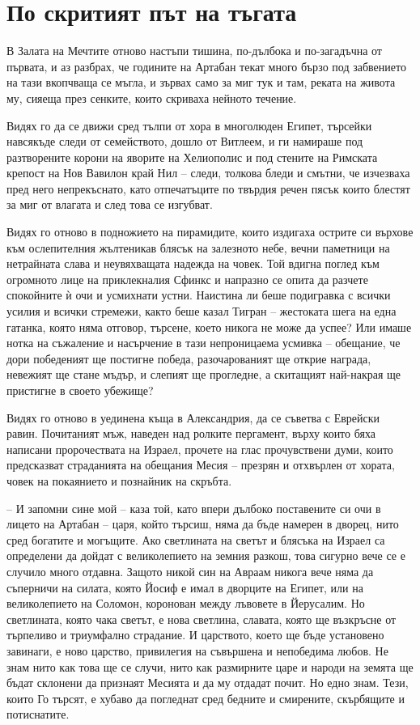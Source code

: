 \part{По скритият път на тъгата}

В Залата на Мечтите отново настъпи тишина, по-дълбока и по-загадъчна от първата,
и аз разбрах, че годините на Артабан текат много бързо под забвението на тази
вкопчваща се мъгла, и зървах само за миг тук и там, реката на живота му, сияеща
през сенките, които скриваха нейното течение.

Видях го да се движи сред тълпи от хора в многолюден Египет, търсейки навсякъде
следи от семейството, дошло от Витлеем, и ги намираше под разтворените корони на
яворите на Хелиополис и под стените на Римската крепост на Нов Вавилон край Нил
-- следи, толкова бледи и смътни, че изчезваха пред него непрекъснато, като
отпечатъците по твърдия речен пясък които блестят за миг от влагата и след това
се изгубват.

Видях го отново в подножието на пирамидите, които издигаха острите си върхове
към ослепителния жълтеникав блясък на залезното небе, вечни паметници на
нетрайната слава и неувяхващата надежда на човек. Той вдигна поглед към
огромното лице на приклекналия Сфинкс и напразно се опита да разчете спокойните
ѝ очи и усмихнати устни. Наистина ли беше подигравка с всички усилия и всички
стремежи, както беше казал Тигран -- жестоката шега на една гатанка, която няма
отговор, търсене, което никога не може да успее? Или имаше нотка на съжаление и
насърчение в тази непроницаема усмивка -- обещание, че дори победеният ще
постигне победа, разочарованият ще открие награда, невежият ще стане мъдър, и
слепият ще прогледне, а скитащият най-накрая ще пристигне в своето убежище?

Видях го отново в уединена къща в Александрия, да се съветва с Еврейски равин.
Почитаният мъж, наведен над ролките пергамент, върху които бяха написани
пророчествата на Израел, прочете на глас прочувствени думи, които предсказват
страданията на обещания Месия -- презрян и отхвърлен от хората, човек на
покаянието и познайник на скръбта.

-- И запомни сине мой -- каза той, като впери дълбоко поставените си очи в
лицето на Артабан -- царя, който търсиш, няма да бъде намерен в дворец, нито
сред богатите и могъщите. Ако светлината на светът и блясъка на Израел са
определени да дойдат с великолепието на земния разкош, това сигурно вече се е
случило много отдавна. Защото никой син на Авраам никога вече няма да съперничи
на силата, която Йосиф е имал в дворците на Египет, или на великолепието на
Соломон, коронован между лъвовете в Йерусалим. Но светлината, която чака светът,
е нова светлина, славата, която ще възкръсне от търпеливо и триумфално
страдание. И царството, което ще бъде установено завинаги, е ново царство,
привилегия на съвършена и непобедима любов. Не знам нито как това ще се случи,
нито как размирните царе и народи на земята ще бъдат склонени да признаят
Месията и да му отдадат почит. Но едно знам. Тези, които Го търсят, е хубаво да
погледнат сред бедните и смирените, скърбящите и потиснатите.

